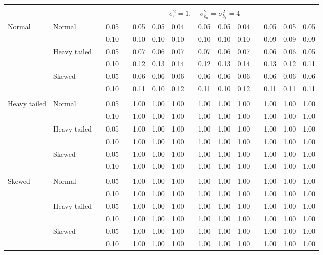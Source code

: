 \begin{table}[ht]
\begin{scriptsize}
\begin{tabular}{ll p{.1cm} c p{.1cm} rrr p{.1cm} rrr p{.1cm} rrr}
&&&&&&&&&&&&&&&\\
& && && \multicolumn{9}{c}{$\sigma_{\varepsilon}^2 = 1$, \ \ $\sigma_{b_0}^2 = \sigma_{b_1}^2 = 4$} \\ \cline{6-16}

\rowcolor{gray!20}Normal       & Normal       && 0.05 &&   0.05 & 0.05 & 0.04 && 0.05 & 0.05 & 0.04 && 0.05 & 0.05 & 0.05 \\ 
\rowcolor{gray!20}             &              && 0.10 &&   0.10 & 0.10 & 0.10 && 0.10 & 0.10 & 0.10 && 0.09 & 0.09 & 0.09 \\ 
\rowcolor{gray!20}             & Heavy tailed && 0.05 &&   0.07 & 0.06 & 0.07 && 0.07 & 0.06 & 0.07 && 0.06 & 0.06 & 0.05 \\ 
\rowcolor{gray!20}             &              && 0.10 &&   0.12 & 0.13 & 0.14 && 0.12 & 0.13 & 0.14 && 0.13 & 0.12 & 0.11 \\ 
\rowcolor{gray!20}             & Skewed       && 0.05 &&   0.06 & 0.06 & 0.06 && 0.06 & 0.06 & 0.06 && 0.06 & 0.06 & 0.06 \\ 
\rowcolor{gray!20}             &              && 0.10 &&   0.11 & 0.10 & 0.12 && 0.11 & 0.10 & 0.12 && 0.11 & 0.11 & 0.11 \\ 
             &&&&&&&&&&&&&&&\\
Heavy tailed & Normal       && 0.05 &&   1.00 & 1.00 & 1.00 && 1.00 & 1.00 & 1.00 && 1.00 & 1.00 & 1.00 \\ 
             &              && 0.10 &&   1.00 & 1.00 & 1.00 && 1.00 & 1.00 & 1.00 && 1.00 & 1.00 & 1.00 \\ 
             & Heavy tailed && 0.05 &&   1.00 & 1.00 & 1.00 && 1.00 & 1.00 & 1.00 && 1.00 & 1.00 & 1.00 \\ 
             &              && 0.10 &&   1.00 & 1.00 & 1.00 && 1.00 & 1.00 & 1.00 && 1.00 & 1.00 & 1.00 \\ 
             & Skewed       && 0.05 &&   1.00 & 1.00 & 1.00 && 1.00 & 1.00 & 1.00 && 1.00 & 1.00 & 1.00 \\ 
             &              && 0.10 &&   1.00 & 1.00 & 1.00 && 1.00 & 1.00 & 1.00 && 1.00 & 1.00 & 1.00 \\ 
             &&&&&&&&&&&&&&&\\
Skewed       & Normal       && 0.05 &&   1.00 & 1.00 & 1.00 && 1.00 & 1.00 & 1.00 && 1.00 & 1.00 & 1.00 \\ 
             &              && 0.10 &&   1.00 & 1.00 & 1.00 && 1.00 & 1.00 & 1.00 && 1.00 & 1.00 & 1.00 \\ 
             & Heavy tailed && 0.05 &&   1.00 & 1.00 & 1.00 && 1.00 & 1.00 & 1.00 && 1.00 & 1.00 & 1.00 \\ 
             &              && 0.10 &&   1.00 & 1.00 & 1.00 && 1.00 & 1.00 & 1.00 && 1.00 & 1.00 & 1.00 \\ 
             & Skewed       && 0.05 &&   1.00 & 1.00 & 1.00 && 1.00 & 1.00 & 1.00 && 1.00 & 1.00 & 1.00 \\ 
             &              && 0.10 &&   1.00 & 1.00 & 1.00 && 1.00 & 1.00 & 1.00 && 1.00 & 1.00 & 1.00 \\ 


\end{tabular}
\end{scriptsize}
\end{table}
